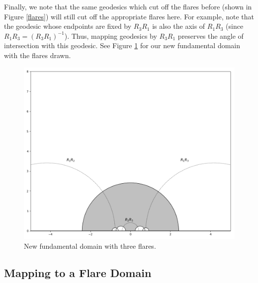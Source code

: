 \documentclass[]{article}
\begin{document}
Finally, we note that the same geodesics which cut off the flares before (shown in Figure \ref{flares}) will still cut off the appropriate flares here.
For example, note that the geodesic whose endpoints are fixed by $R_3R_1$ is also the axis of $R_1R_3$ (since $R_1R_3 = (R_3R_1)^{-1}$).
Thus, mapping geodesics by $R_3R_1$ preserves the angle of intersection with this geodesic.
See Figure \ref{shifted_with_flares} for our new fundamental domain with the flares drawn.
\begin{figure}[h]
	\centering
	\includegraphics[width=0.9\linewidth]{shifted_with_flares.png}
	\caption{New fundamental domain with three flares.}
	\label{shifted_with_flares}
\end{figure}

\clearpage

\subsection*{Mapping to a Flare Domain}
\end{document}
